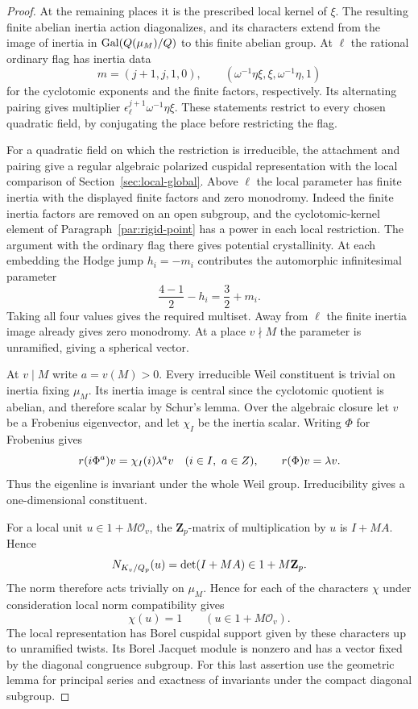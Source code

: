 \begin{proof}
At the remaining places it is the prescribed local
kernel of \(\xi\). The resulting finite abelian inertia action
diagonalizes, and its characters extend from the image of
inertia in \(\operatorname{Gal}(Q(\mu_M)/Q)\) to this
finite abelian group. At \(\ell\) the rational ordinary flag has inertia data
\[
   m=(j+1,j,1,0),\qquad
   (\omega^{-1}\eta\xi,\xi,\omega^{-1}\eta,1)
\]
for the cyclotomic exponents and the finite factors, respectively. Its alternating pairing gives multiplier
\(\epsilon_\ell^{j+1}\omega^{-1}\eta\xi\).
These statements restrict to every chosen quadratic field,
by conjugating the place before restricting the flag.

For a quadratic field on which the restriction is irreducible,
the attachment and pairing give a regular algebraic polarized
cuspidal representation with the local comparison of
Section~\ref{sec:local-global}. Above \(\ell\) the local
parameter has finite inertia with the displayed finite factors
and zero monodromy. Indeed the finite inertia factors are removed
on an open subgroup, and the cyclotomic-kernel element of
Paragraph~\ref{par:rigid-point} has a power in each local
restriction. The argument with the ordinary flag there gives
potential crystallinity. At each embedding the Hodge jump \(h_i=-m_i\) contributes the automorphic infinitesimal parameter
\[
 \frac{4-1}{2}-h_i=\frac32+m_i .
\]
Taking all four values gives the required multiset.
Away from \(\ell\) the finite inertia image already gives
zero monodromy. At a place \(v\nmid M\) the parameter is
unramified, giving a spherical vector.

At \(v\mid M\) write \(a=v(M)>0\). Every irreducible Weil
constituent is trivial on inertia fixing \(\mu_M\). Its inertia
image is central since the cyclotomic quotient is abelian,
and therefore scalar by Schur's lemma. Over the algebraic closure let \(v\) be a Frobenius eigenvector, and let \(\chi_I\) be the inertia scalar. Writing \(\Phi\) for Frobenius gives
\[
 r(i\Phi^a)v=\chi_I(i)\lambda^a v\quad (i\in I,\ a\in\Z),
 \qquad r(\Phi)v=\lambda v .
\]
Thus the eigenline is invariant under the whole Weil group. Irreducibility gives a one-dimensional constituent.

For a local unit \(u\in1+M\mathcal O_v\), the
\(\mathbf Z_p\)-matrix of multiplication by \(u\) is
\(I+MA\). Hence
\[
 N_{K_v/Q_p}(u)=\det(I+MA)\in1+M\mathbf Z_p.
\]
The norm therefore acts trivially on \(\mu_M\).
Hence for each of the characters \(\chi\) under consideration local norm compatibility gives
\[
 \chi(u)=1\qquad(u\in1+M\mathcal O_v).
\]
The local representation
has Borel cuspidal support given by these characters up to
unramified twists. Its Borel Jacquet module is nonzero and
has a vector fixed by the diagonal congruence subgroup.
For this last assertion use the geometric lemma for principal
series and exactness of invariants under the compact diagonal
subgroup.


\end{proof}
